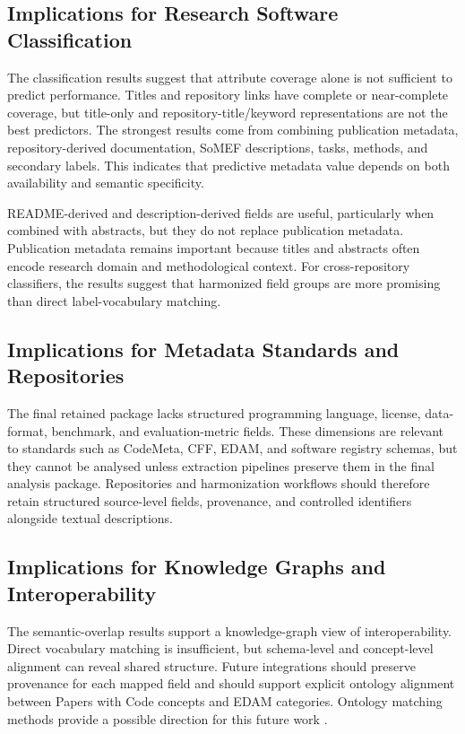 \documentclass[pdflatex,sn-mathphys-num]{sn-jnl}%
\theoremstyle{thmstyleone}%
\theoremstyle{thmstyletwo}%
\theoremstyle{thmstylethree}%
\begin{document}
\subsection{Implications for Research Software Classification}
\label{subsec:discussion-classification}

The classification results suggest that attribute coverage alone is not sufficient to predict performance. Titles and repository links have complete or near-complete coverage, but title-only and repository-title/keyword representations are not the best predictors. The strongest results come from combining publication metadata, repository-derived documentation, SoMEF descriptions, tasks, methods, and secondary labels. This indicates that predictive metadata value depends on both availability and semantic specificity.

README-derived and description-derived fields are useful, particularly when combined with abstracts, but they do not replace publication metadata. Publication metadata remains important because titles and abstracts often encode research domain and methodological context. For cross-repository classifiers, the results suggest that harmonized field groups are more promising than direct label-vocabulary matching.

\subsection{Implications for Metadata Standards and Repositories}
\label{subsec:discussion-standards}

The final retained package lacks structured programming language, license, data-format, benchmark, and evaluation-metric fields. These dimensions are relevant to standards such as CodeMeta, CFF, EDAM, and software registry schemas, but they cannot be analysed unless extraction pipelines preserve them in the final analysis package. Repositories and harmonization workflows should therefore retain structured source-level fields, provenance, and controlled identifiers alongside textual descriptions.

\subsection{Implications for Knowledge Graphs and Interoperability}
\label{subsec:discussion-kg}

The semantic-overlap results support a knowledge-graph view of interoperability. Direct vocabulary matching is insufficient, but schema-level and concept-level alignment can reveal shared structure. Future integrations should preserve provenance for each mapped field and should support explicit ontology alignment between Papers with Code concepts and EDAM categories. Ontology matching methods provide a possible direction for this future work \cite{Euzenat2013OntologyMatching,Otero2015OntologyMatching,Trojahn2022Foundational}.
\end{document}
